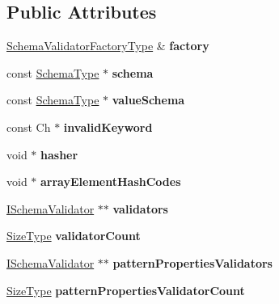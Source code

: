\subsection*{Public Attributes}
\begin{DoxyCompactItemize}
\item 
\mbox{\label{a02380_ae2661ad92602b4f12fbffadb3dab502e}} 
\hyperlink{a02364}{Schema\+Validator\+Factory\+Type} \& {\bfseries factory}
\item 
\mbox{\label{a02380_af44336e8a612b77a0091cc57f8de1734}} 
const \hyperlink{a02356}{Schema\+Type} $\ast$ {\bfseries schema}
\item 
\mbox{\label{a02380_a34865d65fb3cbb01bc497d0efade0458}} 
const \hyperlink{a02356}{Schema\+Type} $\ast$ {\bfseries value\+Schema}
\item 
\mbox{\label{a02380_a9f6a91ee46c70e55f287b1e9b219df21}} 
const Ch $\ast$ {\bfseries invalid\+Keyword}
\item 
\mbox{\label{a02380_a4b419775e207cf72834f895dc30ac596}} 
void $\ast$ {\bfseries hasher}
\item 
\mbox{\label{a02380_a5b6ec1a5fde2215de14a65fcbb06edde}} 
void $\ast$ {\bfseries array\+Element\+Hash\+Codes}
\item 
\mbox{\label{a02380_a1d215b80511f602ebece5c83b875cdd9}} 
\hyperlink{a02360}{I\+Schema\+Validator} $\ast$$\ast$ {\bfseries validators}
\item 
\mbox{\label{a02380_a10e5e97640846f3c23eaaba0506bb4f7}} 
\hyperlink{a00560_a5ed6e6e67250fadbd041127e6386dcb5}{Size\+Type} {\bfseries validator\+Count}
\item 
\mbox{\label{a02380_a758565f674e8fb2066ff0f89ee67a174}} 
\hyperlink{a02360}{I\+Schema\+Validator} $\ast$$\ast$ {\bfseries pattern\+Properties\+Validators}
\item 
\mbox{\label{a02380_a2b8a521d60d39472a1550b535028a353}} 
\hyperlink{a00560_a5ed6e6e67250fadbd041127e6386dcb5}{Size\+Type} {\bfseries pattern\+Properties\+Validator\+Count}
\item 

\end{DoxyCompactItemize}
